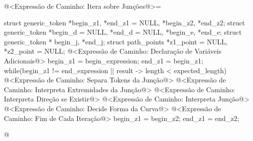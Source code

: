 \iniciocodigo
@<Expressão de Caminho: Itera sobre Junções@>=
{
  struct generic_token *begin_z1, *end_z1 = NULL, *begin_z2, *end_z2;
  struct generic_token *begin_d = NULL, *end_d = NULL, *begin_e, *end_e;
  struct generic_token * begin_j, *end_j;
  struct path_points *z1_point = NULL, *z2_point = NULL;
  @<Expressão de Caminho: Declaração de Variáveis Adicionais@>
  begin_z1 = begin_expression;
  end_z1 = begin_z1;
  while(begin_z1 != end_expression || result -> length < expected_length){
    @<Expressão de Caminho: Separa Tokens da Junção@>
    @<Expressão de Caminho: Interpreta Extremidades da Junção@>
    @<Expressão de Caminho: Interpreta Direção se Existir@>
    @<Expressão de Caminho: Interpreta Junção@>
    @<Expressão de Caminho: Decide Forma da Curva@>
    @<Expressão de Caminho: Fim de Cada Iteração@>
    begin_z1 = begin_z2;
    end_z1 = end_z2;
  }
  
}
@
\fimcodigo

